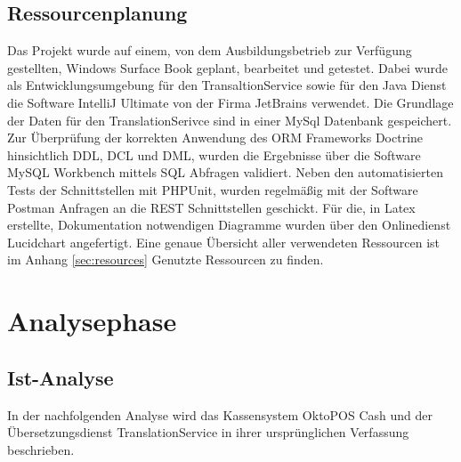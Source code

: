 \documentclass[10pt, oneside, ngerman]{article}
\begin{document}
  \subsection{Ressourcenplanung}
    Das Projekt wurde auf einem, von dem Ausbildungsbetrieb zur Verfügung gestellten, Windows Surface Book geplant, bearbeitet und getestet. 
    Dabei wurde als Entwicklungsumgebung für den TransaltionService sowie für den Java Dienst die Software IntelliJ Ultimate von der Firma JetBrains verwendet. 
    Die Grundlage der Daten für den TranslationSerivce sind in einer MySql Datenbank gespeichert. 
    Zur Überprüfung der korrekten Anwendung des ORM Frameworks Doctrine hinsichtlich DDL, DCL und DML, 
    wurden die Ergebnisse über die Software MySQL Workbench mittels SQL Abfragen validiert. 
    Neben den automatisierten Tests der Schnittstellen mit PHPUnit, 
    wurden regelmäßig mit der Software Postman Anfragen an die REST Schnittstellen geschickt.
    Für die, in Latex erstellte, Dokumentation notwendigen Diagramme wurden über den Onlinedienst Lucidchart angefertigt.
    Eine genaue Übersicht aller verwendeten Ressourcen ist im Anhang \ref{sec:resources} Genutzte Ressourcen zu finden.
  \section{Analysephase}
  \subsection{Ist-Analyse}\label{sec:analyse:current}
    In der nachfolgenden Analyse wird das Kassensystem OktoPOS Cash und der Übersetzungsdienst TranslationService in ihrer ursprünglichen Verfassung beschrieben.
\end{document}
